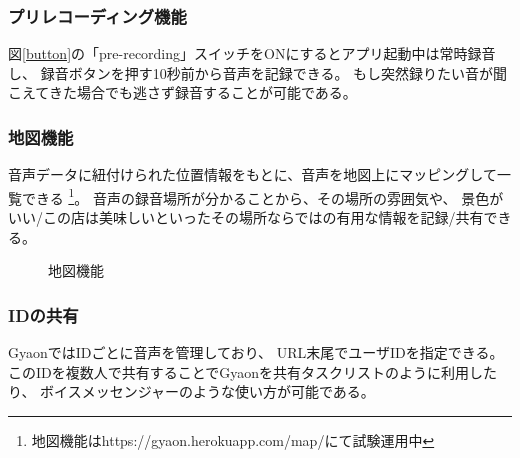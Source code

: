 \subsubsection{プリレコーディング機能}
図\ref{button}の「pre-recording」スイッチをONにするとアプリ起動中は常時録音し、
録音ボタンを押す10秒前から音声を記録できる。
もし突然録りたい音が聞こえてきた場合でも逃さず録音することが可能である。

\subsubsection{地図機能}
音声データに紐付けられた位置情報をもとに、音声を地図上にマッピングして一覧できる
\footnote{\textsf{地図機能はhttps://gyaon.herokuapp.com/map/にて試験運用中}}。
音声の録音場所が分かることから、その場所の雰囲気や、
景色がいい/この店は美味しいといったその場所ならではの有用な情報を記録/共有できる。

\begin{figure}[H]
\centering
{}
\caption{地図機能}
\label{map}
\end{figure}

\subsubsection{IDの共有}
GyaonではIDごとに音声を管理しており、
URL末尾でユーザIDを指定できる。
このIDを複数人で共有することでGyaonを共有タスクリストのように利用したり、
ボイスメッセンジャーのような使い方が可能である。

